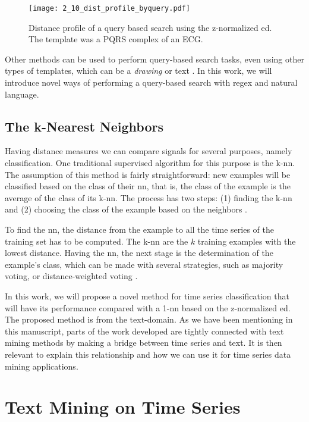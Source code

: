 \begin{figure}
\texttt{[image: 2\_10\_dist\_profile\_byquery.pdf]}
\caption{Distance profile of a query based search using the z-normalized \gls{ed}. The template was a PQRS complex of an ECG.}
\label{fig:query_based}
\end{figure}

Other methods can be used to perform query-based search tasks, even using other types of templates, which can be a \textit{drawing} \cite{qetch} or text \cite{text_query1}. In this work, we will introduce novel ways of performing a query-based search with \gls{regex} and natural language.

\subsection{The k-Nearest Neighbors}

Having distance measures we can compare signals for several purposes, namely classification. One traditional supervised algorithm for this purpose is the k-\gls{nn}. The assumption of this method is fairly straightforward: new examples will be classified based on the class of their \gls{nn}, that is, the class of the example is the average of the class of its k-\gls{nn}. The process has two steps: (1) finding the k-\gls{nn} and (2) choosing the class of the example based on the neighbors \cite{knn}.
\par
To find the \gls{nn}, the distance from the example to all the time series of the training set has to be computed. The k-\gls{nn} are the $k$ training examples with the lowest distance. Having the \gls{nn}, the next stage is the determination of the example's class, which can be made with several strategies, such as majority voting, or distance-weighted voting \cite{knn}.
\par
In this work, we will propose a novel method for time series classification that will have its performance compared with a 1-\gls{nn} based on the z-normalized \gls{ed}. The proposed method is from the text-domain. As we have been mentioning in this manuscript, parts of the work developed are tightly connected with text mining methods by making a bridge between time series and text. It is then relevant to explain this relationship and how we can use it for time series data mining applications. 

\section{Text Mining on Time Series}
\label{sec:text_time}

